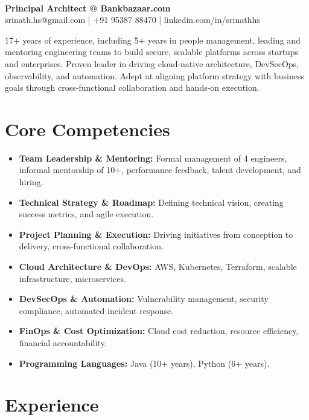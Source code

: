 \documentclass[11pt]{article}
\newcommand{\name}[1]{\noindent{\LARGE\sffamily\textbf{#1}}}
\begin{document}
\pagestyle{empty}
\color{bodytext}

\name{Srinath H S}\\[0.5em]
\textbf{Principal Architect @ Bankbazaar.com}\\[0.3em]
srinath.hs@gmail.com \quad | \quad +91 95387 88470 \quad | \quad linkedin.com/in/srinathhs

17+ years of experience, including 5+ years in people management, leading and mentoring engineering teams to build secure, scalable platforms across startups and enterprises. Proven leader in driving cloud-native architecture, DevSecOps, observability, and automation. Adept at aligning platform strategy with business goals through cross-functional collaboration and hands-on execution.

\section*{Core Competencies}
\begin{itemize}[leftmargin=*, itemsep=-0.5em]
  \item \textbf{Team Leadership \& Mentoring:} Formal management of 4 engineers, informal mentorship of 10+, performance feedback, talent development, and hiring.
  \item \textbf{Technical Strategy \& Roadmap:} Defining technical vision, creating success metrics, and agile execution.
  \item \textbf{Project Planning \& Execution:} Driving initiatives from conception to delivery, cross-functional collaboration.
  \item \textbf{Cloud Architecture \& DevOps:} AWS, Kubernetes, Terraform, scalable infrastructure, microservices.
  \item \textbf{DevSecOps \& Automation:} Vulnerability management, security compliance, automated incident response.
  \item \textbf{FinOps \& Cost Optimization:} Cloud cost reduction, resource efficiency, financial accountability.
  \item \textbf{Programming Languages:} Java (10+ years), Python (6+ years).
\end{itemize}

\section*{Experience}
\end{document}
